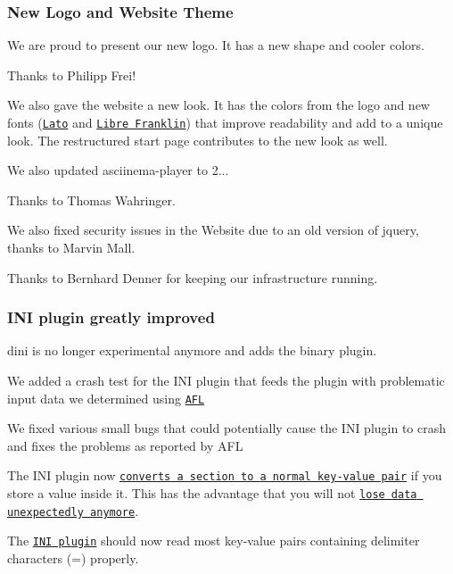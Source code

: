 \subsubsection*{New Logo and Website Theme}

We are proud to present our new logo. It has a new shape and cooler colors.



Thanks to Philipp Frei!

We also gave the website a new look. It has the colors from the logo and new fonts (\href{https://fonts.google.com/specimen/Lato}{\tt Lato} and \href{https://fonts.google.com/specimen/Libre+Franklin}{\tt Libre Franklin}) that improve readability and add to a unique look. The restructured start page contributes to the new look as well.

We also updated asciinema-\/player to 2...

Thanks to Thomas Wahringer.

We also fixed security issues in the Website due to an old version of jquery, thanks to Marvin Mall.

Thanks to Bernhard Denner for keeping our infrastructure running.

\subsubsection*{I\+NI plugin greatly improved}


\begin{DoxyItemize}
\item {\ttfamily dini} is no longer experimental anymore and adds the binary plugin.
\item We added a crash test for the I\+NI plugin that feeds the plugin with problematic input data we determined using \href{http://lcamtuf.coredump.cx/afl}{\tt A\+FL}
\item We fixed various small bugs that could potentially cause the I\+NI plugin to crash and fixes the problems as reported by A\+FL
\item The I\+NI plugin now \href{https://github.com/ElektraInitiative/libelektra/issues/1793}{\tt converts a section to a normal key-\/value pair} if you store a value inside it. This has the advantage that you will not \href{https://github.com/ElektraInitiative/libelektra/issues/1697}{\tt lose data unexpectedly anymore}.
\item The \href{https://www.libelektra.org/plugins/ini}{\tt I\+NI plugin} should now read most key-\/value pairs containing delimiter characters ({\ttfamily =}) properly.
\end{DoxyItemize}


